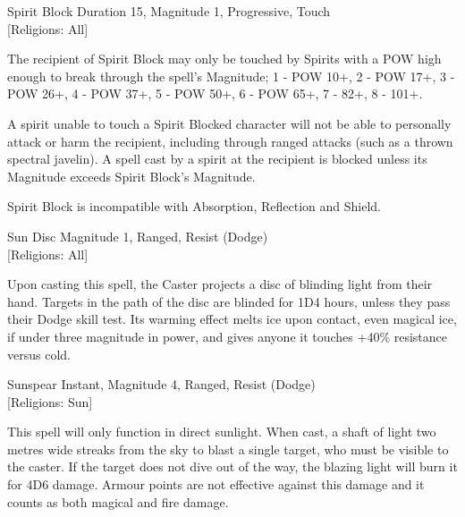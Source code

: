 \begin{rpg-spell}
{Spirit Block}
{Duration 15, Magnitude 1, Progressive, Touch\\{[Religions: All]}}

The recipient of Spirit Block may only be touched by Spirits with a POW high enough to break through the spell’s Magnitude; 1 - POW 10+, 2 - POW 17+, 3 - POW 26+, 4 - POW 37+, 5 - POW 50+, 6 - POW 65+, 7 - 82+, 8 - 101+.

A spirit unable to touch a Spirit Blocked character will not be able to personally attack or harm the recipient, including through ranged attacks (such as a thrown spectral javelin). A spell cast by a spirit at the recipient is blocked unless its Magnitude exceeds Spirit Block’s Magnitude. 

Spirit Block is incompatible with Absorption, Reflection and Shield. 
\end{rpg-spell}

\begin{rpg-spell}
{Sun Disc}
{Magnitude 1, Ranged, Resist (Dodge)\\{[Religions: All]}}

Upon casting this spell, the Caster projects a disc of blinding light from their hand. Targets in the path of the disc are blinded for 1D4 hours, unless they pass their Dodge skill test. Its warming effect melts ice upon contact, even magical ice, if under three magnitude in power, and gives anyone it touches +40\% resistance versus cold.
\end{rpg-spell}

\begin{rpg-spell}
{Sunspear}
{Instant, Magnitude 4, Ranged, Resist (Dodge)\\{[Religions: Sun]}}

This spell will only function in direct sunlight. When cast, a shaft of light two metres wide streaks from the sky to blast a single target, who must be visible to the caster. If the target does not dive out of the way, the blazing light will burn it for 4D6 damage. Armour points are not effective against this damage and it counts as both magical and fire damage. 
\end{rpg-spell}

